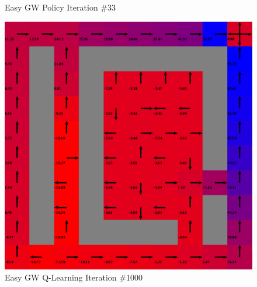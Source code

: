 \documentclass[h]{article}
\begin{document}
\begin{figure}[H]
      \caption*{Easy GW Policy Iteration \#33} 
   \endminipage\hfill
      \includegraphics[width=1\textwidth,keepaspectratio]{easy-q-1000.png} 
      \caption*{Easy GW Q-Learning Iteration \#1000} 
   \endminipage\hfill
\end{figure}
\end{document}
